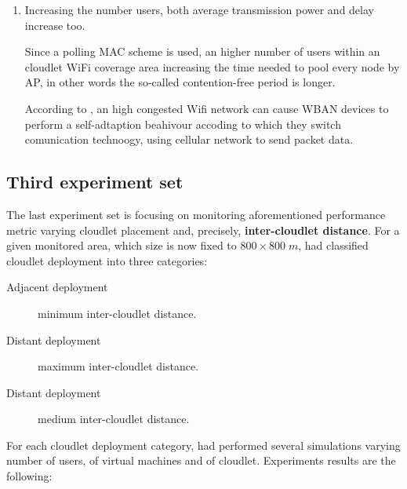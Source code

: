 \documentclass[sigchi]{acmart}
\begin{document}
\begin{enumerate}
\begin{enumerate}
\item Increasing the number users, both average transmission power and delay increase too. 

Since a polling MAC scheme is used, an higher number of users within an cloudlet WiFi coverage area increasing the time needed to pool every node by AP, in other words the so-called contention-free period is longer. 

According to \citep{MSAReport}, an high congested Wifi network can cause WBAN devices to perform a self-adtaption beahivour accoding to which they switch comunication technoogy, using cellular network to send packet data.




\end{enumerate}

\end{enumerate}


\subsection{Third experiment set}

The last experiment set is focusing on monitoring aforementioned performance metric varying cloudlet placement and, precisely, \textbf{inter-cloudlet distance}. For a given monitored area, which size is now fixed to $800 \times 800 \; m$, \citet{MSAReport} had classified cloudlet deployment into three categories:

\begin{description}
\item[Adjacent deployment] minimum inter-cloudlet distance.
\item[Distant deployment] maximum inter-cloudlet distance.
\item[Distant deployment] medium inter-cloudlet distance.
\end{description}

For each cloudlet deployment category, \citet{MSAReport} had performed several simulations varying number of users, of virtual machines and of cloudlet. Experiments results are the following:
\end{document}
